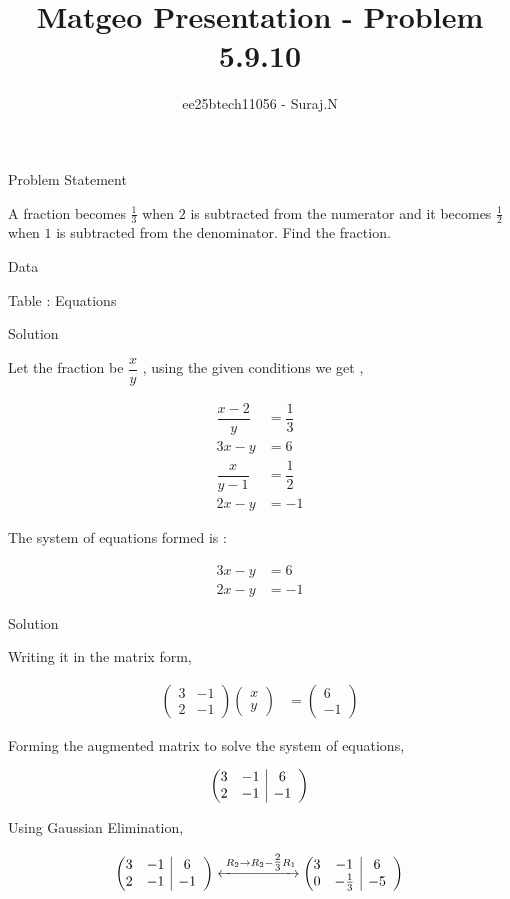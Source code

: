 \documentclass{beamer}
\title{Matgeo Presentation - Problem 5.9.10}
\author{ee25btech11056 - Suraj.N}
\makeatletter
\numberwithin{equation}{section}
\theoremstyle{remark}
\newcommand{\myvec}[1]{\ensuremath{\begin{pmatrix}#1\end{pmatrix}}}
\newenvironment{amatrix}[1]{%
  \left(\begin{array}{@{}*{#1}{c}|*{#1}{c}@{}}
}{%
  \end{array}\right)
}
\newcommand{\myaugvec}[2]{\ensuremath{\begin{amatrix}{#1}#2\end{amatrix}}}
\makeatother
\begin{document}
\begin{frame}
  \titlepage
\end{frame}

\begin{frame}{Problem Statement}

A fraction becomes $\tfrac{1}{3}$ when $2$ is subtracted from the numerator and it becomes $\tfrac{1}{2}$ when $1$ is subtracted from the denominator. Find the fraction.

\end{frame}

\begin{frame}{Data}

\begin{table}[h!]
  \centering
  
  \caption*{Table : Equations}
  \label{5.9.10}
\end{table}

\end{frame}

\begin{frame}{Solution}

Let the fraction be $\dfrac{x}{y}$ , using the given conditions we get ,

\begin{align}
  \dfrac{x-2}{y} &= \dfrac{1}{3}\\
  3x - y &= 6\\
  \dfrac{x}{y-1} &= \dfrac{1}{2}\\
  2x - y &= -1
\end{align}

The system of equations formed is :

\begin{align}
3x - y &= 6\\
2x - y &= -1
\end{align}

\end{frame}

\begin{frame}{Solution}

Writing it in the matrix form,

\begin{align}
  \myvec{3 & -1\\2 & -1}\myvec{x\\y} &= \myvec{6\\-1}
\end{align}

Forming the augmented matrix to solve the system of equations,

\begin{align}
  \myaugvec{2}{3 & -1 & 6\\2 & -1 & -1}
\end{align}

Using Gaussian Elimination,

\begin{align}
 \myaugvec{2}{3 & -1 & 6\\2 & -1 & -1} 
 \xleftrightarrow{\;R_2 \to R_2 -\tfrac{2}{3}R_1}
 \myaugvec{2}{3 & -1 & 6\\0 & -\tfrac{1}{3} & -5} 
\end{align}

\end{frame}
\end{document}
